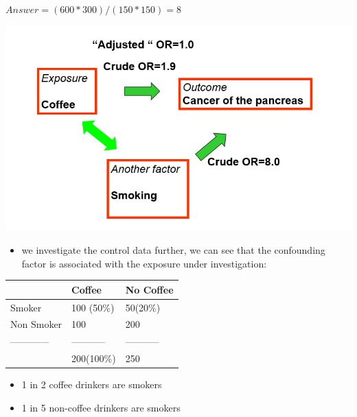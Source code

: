 \documentclass[ignorenonframetext,]{beamer}
\begin{document}
\begin{frame}

\(Answer= (600 * 300 ) / (150* 150) = 8\)

\end{frame}

\begin{frame}

\includegraphics{odds_adjusted.png}

\end{frame}

\begin{frame}

\begin{itemize}
\itemsep1pt\parskip0pt
\item
  we investigate the control data further, we can see that the
  confounding factor is associated with the exposure under
  investigation:
\end{itemize}

\begin{longtable}[c]{@{}lll@{}}
\toprule
& Coffee & No Coffee\tabularnewline
\midrule
\endhead
Smoker & 100 (50\%) & 50(20\%)\tabularnewline
Non Smoker & 100 & 200\tabularnewline
------------ & ----------- & -----------\tabularnewline
& 200(100\%) & 250\tabularnewline
\bottomrule
\end{longtable}

\begin{itemize}
\itemsep1pt\parskip0pt
\item
  1 in 2 coffee drinkers are smokers
\item
  1 in 5 non-coffee drinkers are smokers
\end{itemize}

\end{frame}
\end{document}
